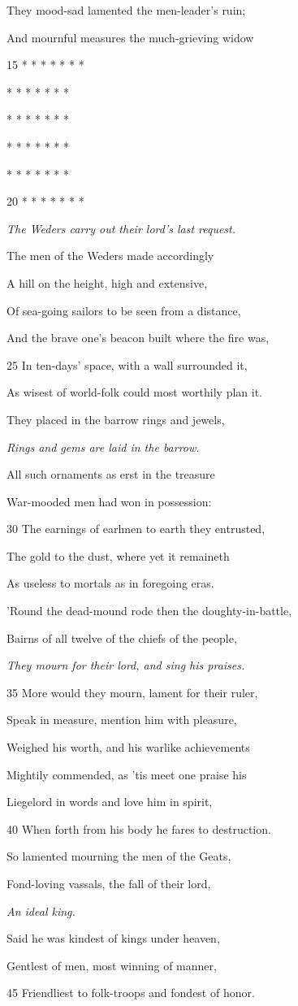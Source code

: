 They mood-sad lamented the men-leader’s ruin;

And mournful measures the much-grieving widow

15
*
*
*
*
*
* *

*
*
*
*
*
* *

*
*
*
*
*
* *

*
*
*
*
*
* *

*
*
*
*
*
* *

20
*
*
*
*
*
* *

\emph{The Weders carry
out their lord’s last
request.}

The men of the Weders made accordingly

A hill on the height, high and extensive,

Of sea-going sailors to be seen from a distance,

And the brave one’s beacon built where the fire was,

25
In ten-days’ space, with a wall surrounded it,

As wisest of world-folk could most worthily plan it.

They placed in the barrow rings and jewels,

\emph{Rings and gems
are laid in the
barrow.}

All such ornaments as erst in the treasure

War-mooded men had won in possession:

30
The earnings of earlmen to earth they entrusted,

The gold to the dust, where yet it remaineth

As useless to mortals as in foregoing eras.

’Round the dead-mound rode then the doughty-in-battle,

Bairns of all twelve of the chiefs of the people,

\emph{They mourn for
their lord, and sing
his praises.}

35
More would they mourn, lament for their ruler,

Speak in measure, mention him with pleasure,

Weighed his worth, and his warlike achievements

Mightily commended, as ’tis meet one praise his

Liegelord in words and love him in spirit,

40
When forth from his body he fares to destruction.

So lamented mourning the men of the Geats,

Fond-loving vassals, the fall of their lord,

\emph{An ideal king.}

Said he was kindest of kings under heaven,

Gentlest of men, most winning of manner,

45
Friendliest to folk-troops and fondest of honor.
